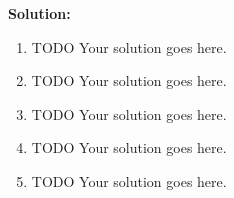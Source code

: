 \documentclass[]{article}
\newcommand{\solution}{\vskip 0.5cm \textbf{\large Solution:} \\}
\begin{document}
\begin{enumerate}[resume]
	  \solution
	  \begin{enumerate}
	  \item TODO Your solution goes here.
	  \item TODO Your solution goes here.
	  \item TODO Your solution goes here.
	  \item TODO Your solution goes here.
	  \item TODO Your solution goes here.
	  \end{enumerate}
    \end{enumerate}
\end{document}

